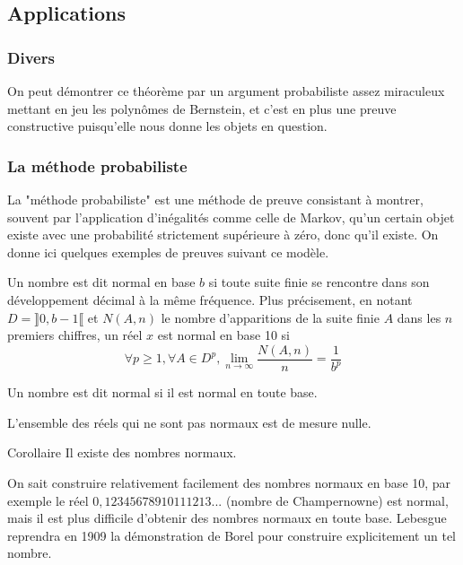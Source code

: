 
\subsection{Applications}
\subsubsection{Divers}
\begin{theoreme}
    
\end{theoreme}
On peut démontrer ce théorème par un argument probabiliste assez miraculeux mettant en jeu les polynômes de Bernstein, et c'est en plus une preuve constructive puisqu'elle nous donne les objets en question. 

\begin{prop}
    
\end{prop}

\subsubsection{La méthode probabiliste}
La "méthode probabiliste" est une méthode de preuve consistant à montrer, souvent par l'application d'inégalités comme celle de Markov, qu'un certain objet existe avec une probabilité strictement supérieure à zéro, donc qu'il existe. On donne ici quelques exemples de preuves suivant ce modèle.

\begin{defini}
    Un nombre est dit normal en base $b$ si toute suite finie se rencontre dans son développement décimal à la même fréquence. Plus précisement, en notant $D=\rrbracket0,b-1\llbracket$ et $N(A, n)$ le nombre d'apparitions de la suite finie $A$ dans les $n$ premiers chiffres, un réel $x$ est normal en base 10 si
    $$\forall p \geq 1, \forall A \in D^p, \lim_{n\to \infty} \frac{N(A, n)}{n} = \frac{1}{b^p}$$
    
    Un nombre est dit normal si il est normal en toute base. 
\end{defini}

\begin{prop}[Borel]
    L'ensemble des réels qui ne sont pas normaux est de mesure nulle.
\end{prop}
    
\begin{boite}{Corollaire}
    Il existe des nombres normaux.
\end{boite}

On sait construire relativement facilement des nombres normaux en base 10, par exemple le réel $0,12345678910111213...$ (nombre de Champernowne) est normal, mais il est plus difficile d'obtenir des nombres normaux en toute base. Lebesgue reprendra en 1909 la démonstration de Borel pour construire explicitement un tel nombre.